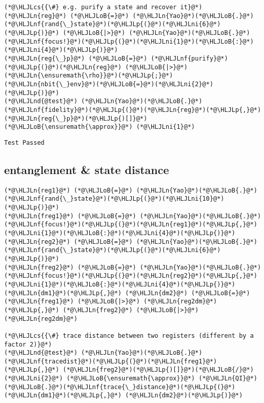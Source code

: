 \documentclass[11pt,a4paper]{article}
\newcommand{\HLJLn}[1]{#1}
\newcommand{\HLJLnd}[1]{\textcolor[RGB]{214,102,97}{#1}}
\newcommand{\HLJLnf}[1]{\textcolor[RGB]{66,102,213}{#1}}
\newcommand{\HLJLni}[1]{\textcolor[RGB]{59,151,46}{#1}}
\newcommand{\HLJLoB}[1]{\textcolor[RGB]{102,102,102}{\textbf{#1}}}
\newcommand{\HLJLp}[1]{#1}
\newcommand{\HLJLcs}[1]{\textcolor[RGB]{153,153,119}{\textit{#1}}}
\begin{document}
\begin{lstlisting}
(*@\HLJLcs{{\#} e.g. purify a state and recover it}@*)
(*@\HLJLn{reg}@*) (*@\HLJLoB{=}@*) (*@\HLJLn{Yao}@*)(*@\HLJLoB{.}@*)(*@\HLJLnf{rand{\_}state}@*)(*@\HLJLp{(}@*)(*@\HLJLni{6}@*)(*@\HLJLp{)}@*) (*@\HLJLoB{|>}@*) (*@\HLJLn{Yao}@*)(*@\HLJLoB{.}@*)(*@\HLJLnf{focus!}@*)(*@\HLJLp{(}@*)(*@\HLJLni{1}@*)(*@\HLJLoB{:}@*)(*@\HLJLni{4}@*)(*@\HLJLp{)}@*)
(*@\HLJLn{reg{\_}p}@*) (*@\HLJLoB{=}@*) (*@\HLJLnf{purify}@*)(*@\HLJLp{(}@*)(*@\HLJLn{reg}@*) (*@\HLJLoB{|>}@*) (*@\HLJLn{\ensuremath{\rho}}@*)(*@\HLJLp{;}@*) (*@\HLJLn{nbit{\_}env}@*)(*@\HLJLoB{=}@*)(*@\HLJLni{2}@*)(*@\HLJLp{)}@*)
(*@\HLJLnd{@test}@*) (*@\HLJLn{Yao}@*)(*@\HLJLoB{.}@*)(*@\HLJLnf{fidelity}@*)(*@\HLJLp{(}@*)(*@\HLJLn{reg}@*)(*@\HLJLp{,}@*) (*@\HLJLn{reg{\_}p}@*)(*@\HLJLp{)[]}@*) (*@\HLJLoB{\ensuremath{\approx}}@*) (*@\HLJLni{1}@*)
\end{lstlisting}

\begin{lstlisting}
Test Passed
\end{lstlisting}


\subsection{entanglement \& state distance}

\begin{lstlisting}
(*@\HLJLn{reg1}@*) (*@\HLJLoB{=}@*) (*@\HLJLn{Yao}@*)(*@\HLJLoB{.}@*)(*@\HLJLnf{rand{\_}state}@*)(*@\HLJLp{(}@*)(*@\HLJLni{10}@*)(*@\HLJLp{)}@*)
(*@\HLJLn{freg1}@*) (*@\HLJLoB{=}@*) (*@\HLJLn{Yao}@*)(*@\HLJLoB{.}@*)(*@\HLJLnf{focus!}@*)(*@\HLJLp{(}@*)(*@\HLJLn{reg1}@*)(*@\HLJLp{,}@*) (*@\HLJLni{1}@*)(*@\HLJLoB{:}@*)(*@\HLJLni{4}@*)(*@\HLJLp{)}@*)
(*@\HLJLn{reg2}@*) (*@\HLJLoB{=}@*) (*@\HLJLn{Yao}@*)(*@\HLJLoB{.}@*)(*@\HLJLnf{rand{\_}state}@*)(*@\HLJLp{(}@*)(*@\HLJLni{6}@*)(*@\HLJLp{)}@*)
(*@\HLJLn{freg2}@*) (*@\HLJLoB{=}@*) (*@\HLJLn{Yao}@*)(*@\HLJLoB{.}@*)(*@\HLJLnf{focus!}@*)(*@\HLJLp{(}@*)(*@\HLJLn{reg2}@*)(*@\HLJLp{,}@*) (*@\HLJLni{1}@*)(*@\HLJLoB{:}@*)(*@\HLJLni{4}@*)(*@\HLJLp{)}@*)
(*@\HLJLn{dm1}@*)(*@\HLJLp{,}@*) (*@\HLJLn{dm2}@*) (*@\HLJLoB{=}@*) (*@\HLJLn{freg1}@*) (*@\HLJLoB{|>}@*) (*@\HLJLn{reg2dm}@*)(*@\HLJLp{,}@*) (*@\HLJLn{freg2}@*) (*@\HLJLoB{|>}@*) (*@\HLJLn{reg2dm}@*)

(*@\HLJLcs{{\#} trace distance between two registers (different by a factor 2)}@*)
(*@\HLJLnd{@test}@*) (*@\HLJLn{Yao}@*)(*@\HLJLoB{.}@*)(*@\HLJLnf{tracedist}@*)(*@\HLJLp{(}@*)(*@\HLJLn{freg1}@*)(*@\HLJLp{,}@*) (*@\HLJLn{freg2}@*)(*@\HLJLp{)[]}@*)(*@\HLJLoB{/}@*)(*@\HLJLni{2}@*) (*@\HLJLoB{\ensuremath{\approx}}@*) (*@\HLJLn{QI}@*)(*@\HLJLoB{.}@*)(*@\HLJLnf{trace{\_}distance}@*)(*@\HLJLp{(}@*)(*@\HLJLn{dm1}@*)(*@\HLJLp{,}@*) (*@\HLJLn{dm2}@*)(*@\HLJLp{)}@*)
\end{lstlisting}
\end{document}
